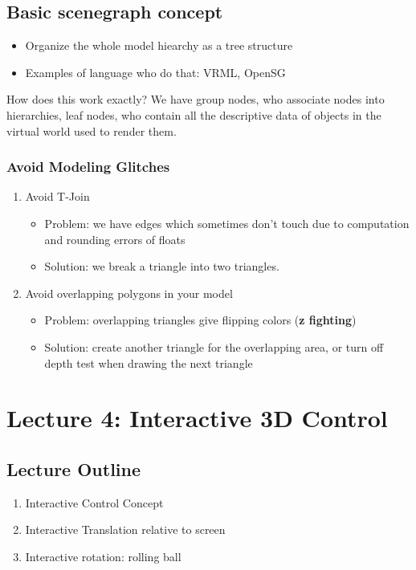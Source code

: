 \documentclass[11pt]{article}
\begin{document}
\subsection{Basic scenegraph concept}
\begin{itemize}
    \item Organize the whole model hiearchy as a tree structure
    \item Examples of language who do that: VRML, OpenSG
\end{itemize}

How does this work exactly? We have group nodes, who associate nodes into hierarchies, leaf nodes, who contain all the descriptive data of objects in the virtual world used to render them.

\subsubsection*{Avoid Modeling Glitches}
\begin{enumerate}
    \item Avoid T-Join \begin{itemize}
        \item Problem: we have edges which sometimes don't touch due to computation and rounding errors of floats
        \item Solution: we break a triangle into two triangles.
    \end{itemize}
    \item Avoid overlapping polygons in your model \begin{itemize}
        \item Problem: overlapping triangles give flipping colors (\textbf{z fighting})
        \item Solution: create another triangle for the overlapping area, or turn off depth test when drawing the next triangle
    \end{itemize}
    
    
\end{enumerate}
 

\section{Lecture 4: Interactive 3D Control}
\subsection*{Lecture Outline}
\begin{enumerate}
    \item Interactive Control Concept
    \item Interactive Translation relative to screen
    \item Interactive rotation: rolling ball
\end{enumerate}
\end{document}
